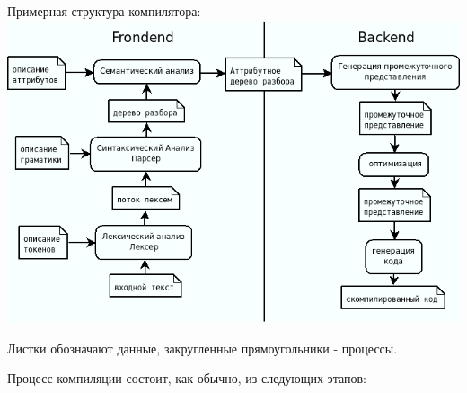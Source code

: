 \documentclass[a4paper,12pt]{article}
\begin{document}
\begin{center}
 Примерная структура компилятора:
 \includegraphics[scale=0.6]{img/compiler2.png}
\end{center}
Листки обозначают данные, закругленные прямоугольники - процессы.

Процесс компиляции состоит, как обычно, из следующих этапов:
\end{document}
